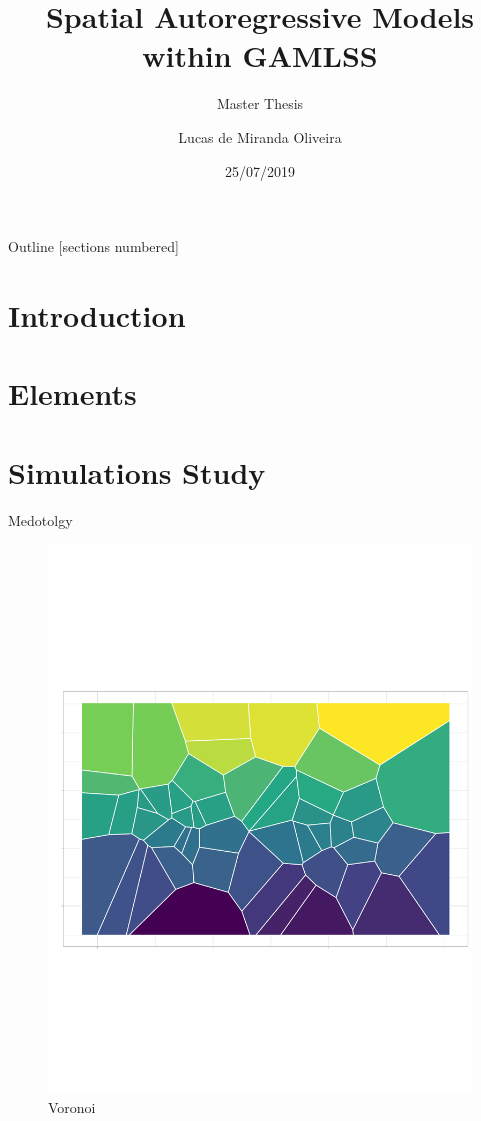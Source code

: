 \documentclass[10pt,unknownkeysallowed]{beamer}
\title{Spatial Autoregressive Models within GAMLSS}
\subtitle{Master Thesis}
\date{25/07/2019}
\author{Lucas de Miranda Oliveira}
\institute{UFPE}
\begin{document}
\maketitle

\begin{frame}{Outline}
  [sections numbered]
  \tableofcontents[hideallsubsections]
\end{frame}

\section{Introduction}


\section{Elements}
\section{Simulations Study}
\begin{frame}{Medotolgy}
  \begin{figure}
\centering
\includegraphics[width=0.7\linewidth]{VoroniDiagrams.pdf}
\caption{Voronoi}
\label{fig:Columbus_Sub}
\end{figure}
\end{frame}
\end{document}
